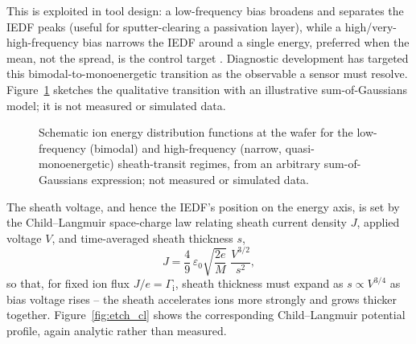 This is exploited in tool design: a low-frequency bias broadens and separates the IEDF peaks (useful for sputter-clearing a passivation layer), while a high/very-high-frequency bias narrows the IEDF around a single energy, preferred when the mean, not the spread, is the control target \cite{ref0540,ref0541}. Diagnostic development has targeted this bimodal-to-monoenergetic transition as the observable a sensor must resolve. Figure~\ref{fig:etch_iedf} sketches the qualitative transition with an illustrative sum-of-Gaussians model; it is not measured or simulated data.

\begin{figure}[htbp]
\centering
{}
\caption{Schematic ion energy distribution functions at the wafer for the low-frequency (bimodal) and high-frequency (narrow, quasi-monoenergetic) sheath-transit regimes, from an arbitrary sum-of-Gaussians expression; not measured or simulated data.}
\label{fig:etch_iedf}
\end{figure}

The sheath voltage, and hence the IEDF's position on the energy axis, is set by the Child--Langmuir space-charge law relating sheath current density $J$, applied voltage $V$, and time-averaged sheath thickness $s$,
\begin{equation}
J = \frac{4}{9}\, \varepsilon_{0} \sqrt{\frac{2e}{M}}\; \frac{V^{3/2}}{s^{2}},
\label{eq:etch_cl}
\end{equation}
so that, for fixed ion flux $J/e = \Gamma_{\mathrm{i}}$, sheath thickness must expand as $s \propto V^{3/4}$ as bias voltage rises -- the sheath accelerates ions more strongly and grows thicker together. Figure~\ref{fig:etch_cl} shows the corresponding Child--Langmuir potential profile, again analytic rather than measured.

